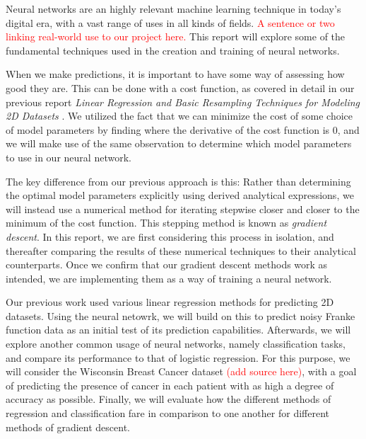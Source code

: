 Neural networks are an highly relevant machine learning technique in today's digital era, with a vast range of uses in all kinds of fields. \textcolor{red}{A sentence or two linking real-world use to our project here.} This report will explore some of the fundamental techniques used in the creation and training of neural networks. 

When we make predictions, it is important to have some way of assessing how good they are. This can be done with a cost function, as covered in detail in our previous report \emph{Linear Regression and Basic Resampling Techniques for Modeling 2D Datasets} \cite{fysstkproject1}. We utilized the fact that we can minimize the cost of some choice of model parameters by finding where the derivative of the cost function is 0, and we will make use of the same observation to determine which model parameters to use in our neural network. 

The key difference from our previous approach is this: Rather than determining the optimal model parameters explicitly using derived analytical expressions, we will instead use a numerical method for iterating stepwise closer and closer to the minimum of the cost function. This stepping method is known as \emph{gradient descent}. In this report, we are first considering this process in isolation, and thereafter comparing the results of these numerical techniques to their analytical counterparts. Once we confirm that our gradient descent methods work as intended, we are implementing them as a way of training a neural network.

Our previous work used various linear regression methods for predicting 2D datasets. Using the neural netowrk, we will build on this to predict noisy Franke function data \cite{franke} as an initial test of its prediction capabilities. Afterwards, we will explore another common usage of neural networks, namely classification tasks, and compare its performance to that of logistic regression. For this purpose, we will consider the Wisconsin Breast Cancer dataset \textcolor{red}{(add source here)}, with a goal of predicting the presence of cancer in each patient with as high a degree of accuracy as possible. Finally, we will evaluate how the different methods of regression and classification fare in comparison to one another for different methods of gradient descent.

